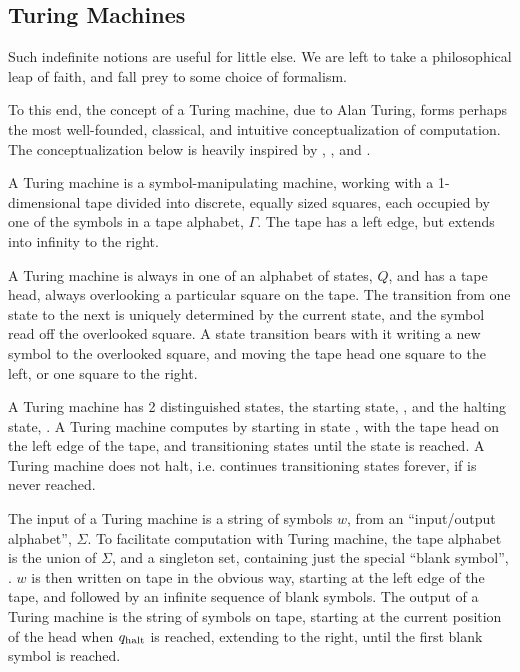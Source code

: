 \subsection{Turing Machines}

Such indefinite notions are useful for little else. We are left to take a
philosophical leap of faith, and fall prey to some choice of formalism.

To this end, the concept of a Turing machine, due to Alan
Turing\cite{turing-1936-7}, forms perhaps the most well-founded, classical, and
intuitive conceptualization of computation. The conceptualization below is
heavily inspired by \cite{jones-1997}, \cite{homer-selman-2011}, and
\cite{sipser-2013}.

A Turing machine is a symbol-manipulating machine, working with a 1-dimensional
tape divided into discrete, equally sized squares, each occupied by one of the
symbols in a tape alphabet, $\Gamma$. The tape has a left edge, but extends
into infinity to the right.

A Turing machine is always in one of an alphabet of states, $Q$, and has a tape
head, always overlooking a particular square on the tape. The transition from
one state to the next is uniquely determined by the current state, and the
symbol read off the overlooked square. A state transition bears with it writing
a new symbol to the overlooked square, and moving the tape head one square to
the left, or one square to the right.

A Turing machine has 2 distinguished states, the starting state, \qstart{}, and
the halting state, \qhalt{}. A Turing machine computes by starting in state
\qstart{}, with the tape head on the left edge of the tape, and transitioning
states until the state \qhalt{} is reached. A Turing machine does not halt,
i.e.  continues transitioning states forever, if \qhalt{} is never reached.

The input of a Turing machine is a string of symbols $w$, from an
``input/output alphabet'', $\Sigma$. To facilitate computation with Turing
machine, the tape alphabet is the union of $\Sigma$, and a singleton set,
containing just the special ``blank symbol'', \textvisiblespace. $w$ is then
written on tape in the obvious way, starting at the left edge of the tape, and
followed by an infinite sequence of blank symbols.  The output of a Turing
machine is the string of symbols on tape, starting at the current position of
the head when $q_{\text{halt}}$ is reached, extending to the right, until the first
blank symbol is reached.

